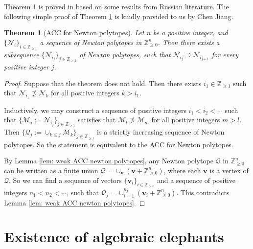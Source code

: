 \documentclass[11pt]{amsart}
\numberwithin{equation}{section}
\newcommand{\Zz}{\mathbb{Z}}
\newcommand{\Zzzero}{{\mathbb Z^n_{\ge0}}}
\newtheorem{thm}{Theorem}[section]
\theoremstyle{definition}
\theoremstyle{definition}
\begin{document}
Theorem \ref{thm: acc newton polytope} is proved in \cite{Ste11} based on some results from Russian literature. The following simple proof of Theorem \ref{thm: acc newton polytope} is kindly provided to us by Chen Jiang.

\begin{thm}[ACC for Newton polytopes]\label{thm: acc newton polytope}
Let $n$ be a positive integer, and $\{\mathcal{N}_i\}_{i\in\Zz_{\ge1}}$ a sequence of Newton polytopes in $\Zzzero$. Then there exists a subsequence $\{\mathcal{N}_{i_j}\}_{j\in\Zz_{\ge1}}$ of Newton polytopes, such that $\mathcal{N}_{i_j}\supseteq\mathcal{N}_{i_{j+1}}$ for every positive integer $j$.
\end{thm}
\begin{proof}
Suppose that the theorem does not hold.
Then there exists $i_1\in\Zz_{\ge 1}$ such that $\mathcal{N}_{i_1}\not \supseteq \mathcal{N}_k$ for all positive integers $k>i_1$.

Inductively, we may construct a sequence of positive integers $i_1<i_2<\cdots$ such that 
$\{\mathcal{M}_j:=\mathcal{N}_{i_j}\}_{j\in\Zz_{\ge1}}$ satisfies that $\mathcal{M}_{l}\not \supseteq \mathcal{M}_m$ for all positive integers $m>l$. Then $\{\mathcal{Q}_j:=\cup_{k\leq j}\mathcal{M}_{k}\}_{j\in \Zz_{\ge1}}$ is a strictly increasing sequence of Newton polytopes. So the statement is equivalent to the ACC for Newton polytopes. 

By Lemma \ref{lem: weak ACC newton polytopes}, any Newton polytope $\mathcal{Q}$ in $\Zzzero$ can be written as a finite union $\mathcal{Q}=\cup_{\bm{v}} (\bm{v}+\mathbb{Z}_{\geq 0}^n)$, where each $\bm{v}$ is a vertex of $\mathcal{Q}$. So we can find a sequence of vectors $\{\bm{v}_i\}_{i\in\Zz_{>0}}$ and a sequence of positive integers $n_1<n_2<\cdots$, such that $\mathcal{Q}_j=\cup_{i=1}^{n_j} (\bm{v}_i+\mathbb{Z}_{\geq 0}^n).$ This contradicts Lemma \ref{lem: weak ACC newton polytopes}.
\end{proof}





\section{Existence of algebraic elephants}
\end{document}
